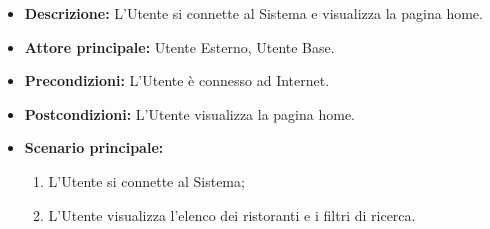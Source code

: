 \label{usecase:Homepage}
\begin{itemize}
    \item \textbf{Descrizione:} L'Utente si connette al Sistema e visualizza la pagina home.

    \item \textbf{Attore principale:} Utente Esterno, Utente Base.

    \item \textbf{Precondizioni:} L'Utente è connesso ad Internet.

    \item \textbf{Postcondizioni:} L'Utente visualizza la pagina home.

    \item \textbf{Scenario principale:}
    \begin{enumerate}
        \item L'Utente si connette al Sistema;
        \item L'Utente visualizza l'elenco dei ristoranti e i filtri di ricerca.
    \end{enumerate}
\end{itemize}
